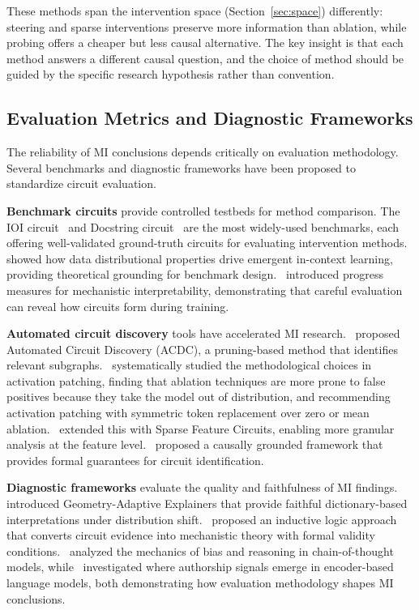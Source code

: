 \documentclass[pdflatex,sn-mathphys-num]{sn-jnl}
\begin{document}
These methods span the intervention space (Section~\ref{sec:space}) differently: steering and sparse interventions preserve more information than ablation, while probing offers a cheaper but less causal alternative. The key insight is that each method answers a different causal question, and the choice of method should be guided by the specific research hypothesis rather than convention.


\subsection{Evaluation Metrics and Diagnostic Frameworks}

The reliability of MI conclusions depends critically on evaluation methodology. Several benchmarks and diagnostic frameworks have been proposed to standardize circuit evaluation.

\textbf{Benchmark circuits} provide controlled testbeds for method comparison. The IOI circuit~\cite{Wang2022} and Docstring circuit~\cite{HeimersheimJaniak2023} are the most widely-used benchmarks, each offering well-validated ground-truth circuits for evaluating intervention methods.~\cite{Chan2022} showed how data distributional properties drive emergent in-context learning, providing theoretical grounding for benchmark design.~\cite{Nanda2023} introduced progress measures for mechanistic interpretability, demonstrating that careful evaluation can reveal how circuits form during training.

\textbf{Automated circuit discovery} tools have accelerated MI research.~\cite{Conmy2023} proposed Automated Circuit Discovery (ACDC), a pruning-based method that identifies relevant subgraphs.~\cite{ZhangNanda2023} systematically studied the methodological choices in activation patching, finding that ablation techniques are more prone to false positives because they take the model out of distribution, and recommending activation patching with symmetric token replacement over zero or mean ablation.~\cite{Marks2024} extended this with Sparse Feature Circuits, enabling more granular analysis at the feature level.~\cite{Mahale2026} proposed a causally grounded framework that provides formal guarantees for circuit identification.

\textbf{Diagnostic frameworks} evaluate the quality and faithfulness of MI findings.~\cite{Lima2026} introduced Geometry-Adaptive Explainers that provide faithful dictionary-based interpretations under distribution shift.~\cite{Aljaafari2026} proposed an inductive logic approach that converts circuit evidence into mechanistic theory with formal validity conditions.~\cite{Pearman2026} analyzed the mechanics of bias and reasoning in chain-of-thought models, while~\cite{Kulumba2026} investigated where authorship signals emerge in encoder-based language models, both demonstrating how evaluation methodology shapes MI conclusions.
\end{document}
